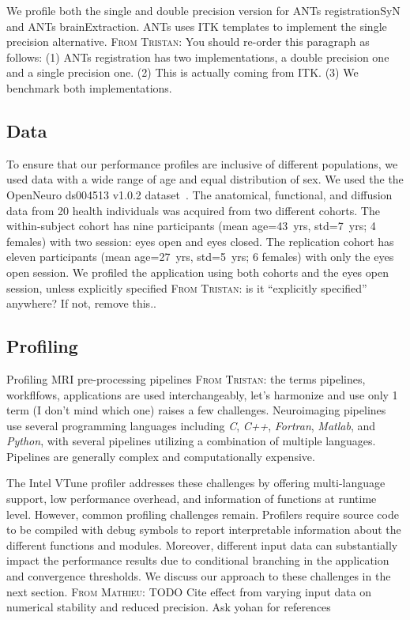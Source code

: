 \documentclass[conference]{IEEEtran}
\newcommand{\TG}[1]{\color{blue}\textsc{From Tristan: }#1\color{black}}
\newcommand{\MD}[1]{\color{magenta}\textsc{From Mathieu: }#1\color{black}}
\begin{document}
We profile both the single and double precision version for ANTs registrationSyN and ANTs brainExtraction. ANTs uses ITK templates to implement the single precision alternative. \TG{You should re-order this paragraph as follows: (1) ANTs registration has two implementations, a double precision one and a single precision one. (2) This is actually coming from ITK. (3) We benchmark both implementations.}

\subsection{Data}
To ensure that our performance profiles are inclusive of different populations, we used data with a wide range of age and equal distribution of sex. We used the the OpenNeuro ds004513 v1.0.2 dataset~\cite{ds004513:1.0.2}. The anatomical, functional, and diffusion data from 20 health individuals was acquired from two different cohorts. The within-subject cohort has nine participants (mean age=43~yrs, std=7~yrs; 4 females) with two session: eyes open and eyes closed. The replication cohort has eleven participants (mean age=27~yrs, std=5~yrs; 6 females) with only the eyes open session. We profiled the application using both cohorts and the eyes open session, unless explicitly specified \TG{is it ``explicitly specified'' anywhere? If not, remove this.}.

\subsection{Profiling}
Profiling MRI pre-processing pipelines \TG{the terms pipelines, workflfows, applications are used interchangeably, let's harmonize and use only 1 term (I don't mind which one)} raises a few challenges. Neuroimaging pipelines use several programming languages including \textit{C}, \textit{C++}, \textit{Fortran}, \textit{Matlab}, and \textit{Python}, with several pipelines utilizing a combination of multiple languages. Pipelines are generally complex and computationally expensive.

The Intel VTune profiler addresses these challenges by offering multi-language support, low performance overhead, and information of functions at runtime level. However, common profiling challenges remain. Profilers require source code to be compiled with debug symbols to report interpretable information about the different functions and modules. Moreover, different input data can substantially impact the performance results due to conditional branching in the application and convergence thresholds. We discuss our approach to these challenges in the next section.
\MD{TODO Cite effect from varying input data on numerical stability and reduced precision. Ask yohan for references}
		
\end{document}

